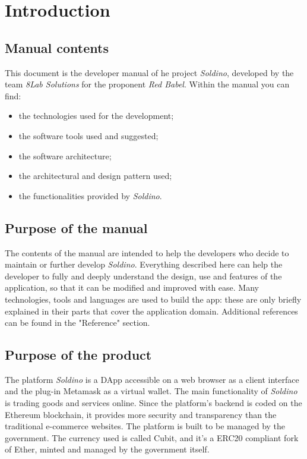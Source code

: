 \section{Introduction} 
\subsection{Manual contents}
This document is the developer manual of he project \textit{Soldino}, developed by the team \textit{8Lab Solutions} for the proponent \textit{Red Babel}.\newline
Within the manual you can find:
\begin{itemize}
	\item the technologies used for the development;
	\item the software tools used and suggested;
	\item the software architecture;
	\item the architectural and design pattern used;
	\item the functionalities provided by \textit{Soldino}.
\end{itemize}

\subsection{Purpose of the manual}
The contents of the manual are intended to help the developers who decide to 
maintain or further develop \textit{Soldino}. Everything described here can 
help the developer to fully and deeply understand the design, use and features 
of the application, so that it can be modified and improved with ease.\newline
Many technologies, tools and languages are used to build the app: these are 
only briefly explained in their parts that cover the application domain. 
Additional references can be found in the "Reference" section.

\subsection{Purpose of the product}
The platform \textit{Soldino} is a DApp accessible on a web browser as a 
client interface and the plug-in Metamask as a virtual wallet.\newline
The main functionality of \textit{Soldino} is trading goods and services 
online. Since the platform's backend is coded on the Ethereum blockchain, it 
provides more security and transparency than the traditional e-commerce 
websites.\newline
The platform is built to be managed by the government. The currency used is 
called Cubit, and it's a ERC20 compliant fork of Ether, minted and managed by 
the government itself.

